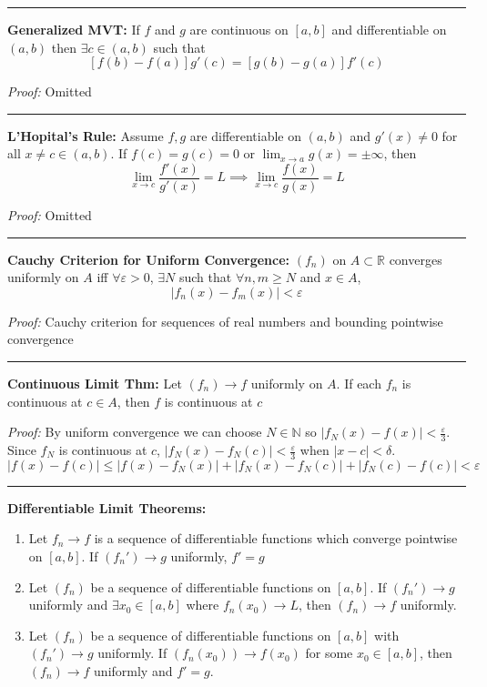 \documentclass[12pt]{article}
\newcommand{\R}{\mathbb{R}}
\newcommand{\N}{\mathbb{N}}
\newcommand{\abs}[1]{\left\vert #1 \right\vert}
\newcommand{\ep}{\varepsilon}
\renewcommand{\hline}{\vspace*{10pt} \hrule \vspace*{10pt}}
\begin{document}
    \hline 

    \textbf{Generalized MVT:} If $f$ and $g$ are continuous on $[a, b]$ and differentiable on $(a, b)$ then $\exists c \in (a, b)$ such that 
    \[[f(b) - f(a)]g'(c) = [g(b) - g(a)]f'(c)\]
    
        \emph{Proof:} Omitted

    \hline 

    \textbf{L'Hopital's Rule:} Assume $f, g$ are differentiable on $(a, b)$ and $g'(x) \neq 0$ for all $x \neq c \in (a, b)$. If $f(c) = g(c) = 0$ or $\lim_{x\to a} g(x) = \pm \infty$, then
    \[\lim_{x \to c} \frac{f'(x)}{g'(x)} = L \implies \lim_{x \to c} \frac{f(x)}{g(x)} = L\]

        \emph{Proof:} Omitted

    \hline 

    \textbf{Cauchy Criterion for Uniform Convergence:} $(f_n)$ on $A \subset \R$ converges uniformly on $A$ iff $\forall \ep > 0$, $\exists N$ such that $\forall n, m \geq N$ and $x \in A$,
    \[\abs{f_n(x) - f_m(x)} < \ep\]

        \emph{Proof:} Cauchy criterion for sequences of real numbers and bounding pointwise convergence  

    \hline

    \textbf{Continuous Limit Thm:} Let $(f_n) \to f$ uniformly on $A$. If each $f_n$ is continuous at $c \in A$, then $f$ is continuous at $c$

        \emph{Proof:} By uniform convergence we can choose $N \in \N$ so $\abs{f_N(x) - f(x)} < \frac{\ep}{3}$. Since $f_N$ is continuous at $c$, $\abs{f_N(x) - f_N(c)} < \frac{\ep}{3}$ when $\abs{x - c} < \delta$. 
        \[\abs{f(x) - f(c)} \leq \abs{f(x) - f_N(x)} + \abs{f_N(x) - f_N(c)} + \abs{f_N(c) - f(c)} < \ep\]

    \hline 

    \textbf{Differentiable Limit Theorems:} 
    \begin{enumerate}
        \item Let $f_n \to f$ is a sequence of differentiable functions which converge pointwise on $[a, b]$. If $(f_n') \to g$ uniformly, $f' = g$ 
        
        \item Let $(f_n)$ be a sequence of differentiable functions on $[a, b]$. If $(f_n') \to g$  uniformly and $\exists x_0 \in [a, b]$ where $f_n(x_0) \to L$, then $(f_n) \to f$ uniformly.
        
        \item Let $(f_n)$ be a sequence of differentiable functions on $[a, b]$ with $(f_n') \to g$ uniformly. If $(f_n(x_0)) \to f(x_0)$ for some $x_0 \in [a, b]$, then $(f_n) \to f$ uniformly and $f' = g$.
    \end{enumerate}
\end{document}
